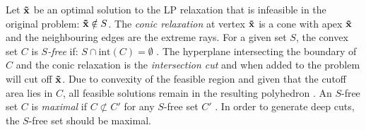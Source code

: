 
Let $\bold{\tilde x}$ be an optimal solution to the LP relaxation that is infeasible in the original problem: $\bold{\tilde x} \notin S$. %
The \textit{conic relaxation} at vertex $\bold{\tilde x}$ is a cone with apex $\bold{\tilde x}$ and the neighbouring edges are the extreme rays. For a given set $S$, the convex set $C$ is \textit{$S$-free} if: $S \cap \text{int}(C) = \emptyset$ \cite{bienstock_outer_product_free_sets}. 
The hyperplane intersecting the boundary of $C$ and the conic relaxation is the \textit{intersection cut} and when added to the problem will cut off $\bold{\tilde x}$. Due to convexity of the feasible region and given that the cutoff area lies in $C$, all feasible solutions remain in the resulting polyhedron %
\cite{musalem_intersection_cuts}.
An $S$-free set $C$ is \textit{maximal} if $C \not \subset C'$ for any $S$-free set $C'$ \cite{bienstock_outer_product_free_sets}. In order to generate deep cuts, the $S$-free set should be maximal. 

